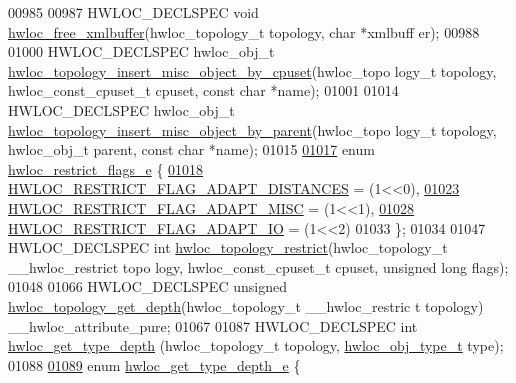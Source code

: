 \begin{DoxyCode}
00985 
00987 HWLOC\_DECLSPEC \textcolor{keywordtype}{void} \hyperlink{a00045_ga5e375acef034bebc1f20ead884697301}{hwloc_free_xmlbuffer}(hwloc\_topology\_t topology, \textcolor{keywordtype}{char} *xmlbuff
      er);
00988 
01000 HWLOC\_DECLSPEC hwloc\_obj\_t \hyperlink{a00045_ga017a9ba16d554326c6e3812d545d7230}{hwloc_topology_insert_misc_object_by_cpuset}(hwloc\_topo
      logy\_t topology, hwloc\_const\_cpuset\_t cpuset, \textcolor{keyword}{const} \textcolor{keywordtype}{char} *name);
01001 
01014 HWLOC\_DECLSPEC hwloc\_obj\_t \hyperlink{a00045_gadacd7a3d21220fbb30c3256d8b22a294}{hwloc_topology_insert_misc_object_by_parent}(hwloc\_topo
      logy\_t topology, hwloc\_obj\_t parent, \textcolor{keyword}{const} \textcolor{keywordtype}{char} *name);
01015 
\hypertarget{a00033_source_l01017}{}\hyperlink{a00045_ga9d80f08eb25b7ac22f1b998dc8bf521f}{01017} \textcolor{keyword}{enum} \hyperlink{a00045_ga9d80f08eb25b7ac22f1b998dc8bf521f}{hwloc_restrict_flags_e} \{
\hypertarget{a00033_source_l01018}{}\hyperlink{a00045_gga9d80f08eb25b7ac22f1b998dc8bf521fa4d18407f5520793b50b9e892f5bb55d1}{01018}   \hyperlink{a00045_gga9d80f08eb25b7ac22f1b998dc8bf521fa4d18407f5520793b50b9e892f5bb55d1}{HWLOC_RESTRICT_FLAG_ADAPT_DISTANCES} = (1<<0),
\hypertarget{a00033_source_l01023}{}\hyperlink{a00045_gga9d80f08eb25b7ac22f1b998dc8bf521fa699969227a09bbc1a7de51dc9fb7be4b}{01023}   \hyperlink{a00045_gga9d80f08eb25b7ac22f1b998dc8bf521fa699969227a09bbc1a7de51dc9fb7be4b}{HWLOC_RESTRICT_FLAG_ADAPT_MISC} = (1<<1),
\hypertarget{a00033_source_l01028}{}\hyperlink{a00045_gga9d80f08eb25b7ac22f1b998dc8bf521faa95d6985e36ec1e55f68b210297a85cb}{01028}   \hyperlink{a00045_gga9d80f08eb25b7ac22f1b998dc8bf521faa95d6985e36ec1e55f68b210297a85cb}{HWLOC_RESTRICT_FLAG_ADAPT_IO} = (1<<2)
01033 \};
01034 
01047 HWLOC\_DECLSPEC \textcolor{keywordtype}{int} \hyperlink{a00045_gad75fa918e3eb54663bdeab25ed89b648}{hwloc_topology_restrict}(hwloc\_topology\_t \_\_hwloc\_restrict topo
      logy, hwloc\_const\_cpuset\_t cpuset, \textcolor{keywordtype}{unsigned} \textcolor{keywordtype}{long} flags);
01048 
01066 HWLOC\_DECLSPEC \textcolor{keywordtype}{unsigned} \hyperlink{a00046_ga8c30b0cec55074eb3ed34e4f2a1a9937}{hwloc_topology_get_depth}(hwloc\_topology\_t \_\_hwloc\_restric
      t topology) \_\_hwloc\_attribute\_pure;
01067 
01087 HWLOC\_DECLSPEC \textcolor{keywordtype}{int} \hyperlink{a00046_gaea7c64dd59467f5201ba87712710b14d}{hwloc_get_type_depth} (hwloc\_topology\_t topology, 
      \hyperlink{a00041_gacd37bb612667dc437d66bfb175a8dc55}{hwloc_obj_type_t} type);
01088 
\hypertarget{a00033_source_l01089}{}\hyperlink{a00046_gaf4e663cf42bbe20756b849c6293ef575}{01089} \textcolor{keyword}{enum} \hyperlink{a00046_gaf4e663cf42bbe20756b849c6293ef575}{hwloc_get_type_depth_e} \{

\end{DoxyCode}
